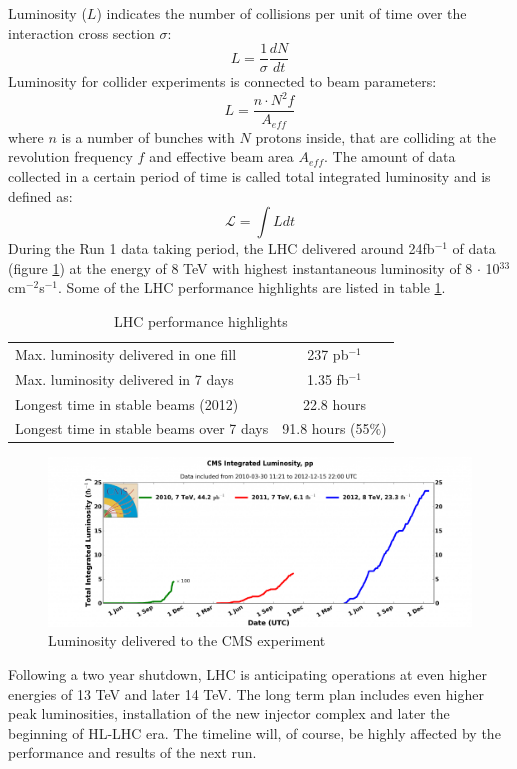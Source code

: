 Luminosity ($L$) indicates the number of collisions per unit of time over the interaction cross section $\sigma$:
\begin{equation}
L=\frac{1}{\sigma}\frac{dN}{dt}
\end{equation}
Luminosity for collider experiments is connected to beam parameters:
\begin{equation}
L=\frac{n\cdot N^2 f}{A_{eff}}
\end{equation}
where $n$ is a number of bunches with $N$ protons inside, that are colliding at the revolution frequency $f$ and effective beam area $A_{eff}$. The amount of data collected in a certain period of time is called total integrated luminosity and is defined as:
\begin{equation}
\mathcal{L} = \int L dt
\end{equation} 
During the Run 1 data taking period, the LHC delivered around 24fb$^{-1}$ of data (figure \ref{fig:LHC_lumi}) at the energy of 8 TeV with highest instantaneous luminosity of 8 $\cdot$ 10$^33$ cm$^{-2}$s$^{-1}$. Some of the LHC performance highlights are listed in table \ref{tab:LHC_highlights}.
\begin{table}[h]
\centering
  \caption{LHC performance highlights}
  \label{tab:LHC_highlights}
  \begin{tabular}{ l  c }
      \hline
      \hline
      Max. luminosity delivered in one fill & 237 pb$^{-1}$  \\
      Max. luminosity delivered in 7 days & 1.35 fb$^{-1}$  \\
      Longest time in stable beams (2012) & 22.8 hours \\
      Longest time in stable beams over 7 days & 91.8 hours (55$\%$) \\
      \hline
      \hline 
  \end{tabular}
\end{table}
\begin{figure}[htbp]
	\centering
		\includegraphics[width=\textwidth]{Figures/lumi.png}
	\caption[Luminosity delivered to the CMS experiment]{Luminosity delivered to the CMS experiment}
	\label{fig:LHC_lumi}
\end{figure} 
\par Following a two year shutdown, LHC is anticipating operations at even higher energies of 13 TeV and later 14 TeV. The long term plan includes even higher peak luminosities, installation of the new injector complex and later the beginning of HL-LHC era. The timeline will, of course, be highly affected by the performance and results of the next run.